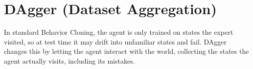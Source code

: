 \section{DAgger (Dataset Aggregation)}

In standard Behavior Cloning, the agent is only trained on states the expert visited, so at test time it may drift into unfamiliar states and fail. DAgger changes this by letting the agent interact with the world, collecting the states the agent actually visits, including its mistakes.


\begin{enumerate}[(a)]

  

  

\end{enumerate}



